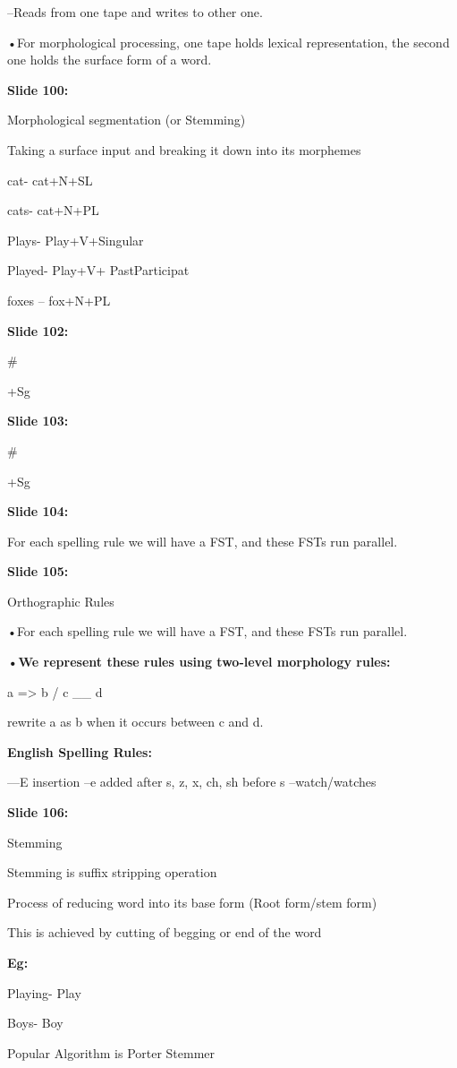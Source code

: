 \documentclass[11pt,a4paper]{article}
\begin{document}
–Reads from one tape and writes to other one.

•For morphological processing, one tape holds lexical representation, the second one holds the surface form of a word.

\textbf{Slide 100:}

Morphological segmentation (or Stemming)

Taking a surface input and breaking it down into its morphemes

cat- 		cat+N+SL

cats- 		cat+N+PL

Plays- 	Play+V+Singular

Played- 	Play+V+ PastParticipat

foxes – 	fox+N+PL

\textbf{Slide 102:}

\#

+Sg

\textbf{Slide 103:}

\#

+Sg

\textbf{Slide 104:}

For each spelling rule we will have a FST, and these FSTs run parallel.

\textbf{Slide 105:}

Orthographic Rules

•For each spelling rule we will have a FST, and these FSTs run parallel.

\textbf{•We represent these rules using two-level morphology rules:} 

a => b / c \_\_ d

rewrite a as b when it occurs between c and d.

\textbf{English Spelling Rules:} 

––E insertion --e added after s, z, x, ch, sh  before s --watch/watches

\textbf{Slide 106:}

Stemming

Stemming is suffix stripping operation

Process of reducing word into its base form (Root form/stem form)

This is achieved by cutting of begging or end of the word

\textbf{Eg:} 

Playing-    Play

Boys-         Boy

Popular Algorithm is Porter Stemmer
\end{document}
